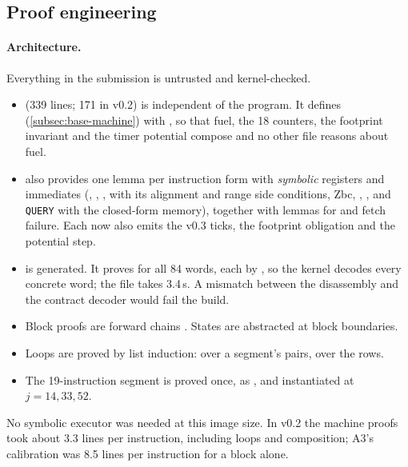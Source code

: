 \subsection{Proof engineering}\label{subsec:base-proof}

\paragraph{Architecture.} Everything in the submission is untrusted and kernel-checked.
\begin{itemize}[nosep]
\item {} (339 lines; 171 in v0.2) is independent of the program. It defines
   (\cref{subsec:base-machine}) with , so that fuel, the 18 counters, the
  footprint invariant and the timer potential compose and no other file reasons about fuel.
\item {} also provides one lemma per instruction form with \emph{symbolic} registers and
  immediates (, , ,  with its alignment and range side
  conditions, Zbc, , , and \texttt{QUERY} with the closed-form memory), together
  with lemmas for  and fetch failure. Each now also emits the v0.3 ticks, the footprint
  obligation and the potential step.
\item {} is generated. It proves  for all 84 words, each
  by , so the kernel decodes every concrete word; the file takes 3.4\,s. A mismatch between
  the disassembly and the contract decoder would fail the build.
\item Block proofs are forward chains . States are
  abstracted at block boundaries.
\item Loops are proved by list induction:  over a segment's pairs,  over
  the rows.
\item The 19-instruction segment is proved once, as , and instantiated at
  $j=14,33,52$.
\end{itemize}
No symbolic executor was needed at this image size. In v0.2 the machine proofs took about 3.3 lines per
instruction, including loops and composition; A3's calibration was 8.5 lines per instruction for a
block alone.

